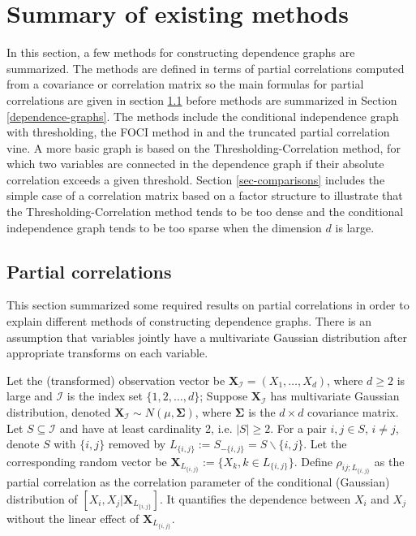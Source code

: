 \documentclass[a4paper]{article}
\def\ii {{\mathcal{I}}}
\def\bfx{{\bm{X}}}
\def\lij {L_{\{i,j\}}}
\def\sigb{{\boldsymbol{\Sigma}}}
\begin{document}
\section{Summary of existing methods}
\label{sec-methods}
In this section, a few methods for constructing dependence graphs are summarized. The methods
are defined in terms of partial correlations computed from a covariance or correlation matrix so the main formulas for partial correlations are given in section \ref{sec-partialcor} before methods are summarized
in Section \ref{dependence-graphs}. The methods include the conditional independence graph with thresholding, the FOCI method in \cite{magwene2004estimating} and the truncated partial correlation vine. A more basic graph is based on the Thresholding-Correlation method, for which two variables are connected in the dependence graph if their absolute correlation exceeds a given threshold. Section  \ref{sec-comparisons} includes the simple case of a correlation
matrix based on a factor structure to illustrate that the
Thresholding-Correlation method tends to be too dense and the conditional
independence graph tends to be too sparse when the dimension $d$ is large.

\subsection{Partial correlations}
\label{sec-partialcor}
This section summarized some required results on partial correlations in order to explain different
methods of constructing dependence graphs.
There is an assumption that variables jointly have a multivariate Gaussian distribution after appropriate transforms on each variable.

Let the (transformed) observation vector be $\bfx_{\ii}=(X_1,\ldots,X_{d})$, where $d\geq 2$ is large and $\ii$ is the index set $\{1,2,\ldots,d\}$; Suppose $\bfx_{\ii}$ has multivariate Gaussian distribution, denoted $\bfx_{\ii}\sim N(\mu,\sigb)$, where $\sigb$ is the $d\times d$ covariance matrix. Let $S \subseteq \ii $ and have at least cardinality 2, i.e. $|S|\geq 2$. For a pair $i,j \in S$, $i\neq j$, denote $S$ with $\{i,j\}$ removed by $\lij:=S_{-\{i,j\}}=S\backslash \{i,j\}$. Let the corresponding random vector be $\bfx_{\lij}:=\{X_{k},k\in \lij \}$. Define $\rho_{ij;\lij}$ as the partial correlation as the correlation parameter of the conditional (Gaussian) distribution of $[X_i,X_j|\bfx_{\lij}]$. It quantifies the dependence between $X_i$ and $X_{j}$ without the linear effect of $\bfx_{\lij}$.
\end{document}
